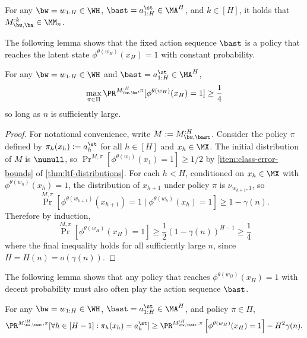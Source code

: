 \begin{fact}
For any $\bw=w_{1:H} \in \WH$, $\bast =a^\st_{1:H}\in \MA^H$, and $k \in [H]$, it holds that $M_{\bw,\ba}^{:k} \in \MM_n$.
\end{fact}

The following lemma shows that the fixed action sequence $\bast$ is a policy that reaches the latent state $\phi^{\theta(w_H)}(x_H) = 1$ with constant probability.

\begin{lemma}\label{lemma:best-policy}
For any $\bw=w_{1:H} \in \WH$ and $\bast =a^\st_{1:H}\in \MA^H$, 
\[\max_{\pi\in\Pi} \Pr^{M_{\bw,\ba}^{:H},\pi}[\phi^{\theta(w_H)}(x_H) = 1] \geq \frac{1}{4}\]
so long as $n$ is sufficiently large.
\end{lemma}

\begin{proof}
For notational convenience, write $M := M_{\bw,\bast}^{:H}$. Consider the policy $\pi$ defined by $\pi_h(x_h) := a^\st_h$ for all $h \in [H]$ and $x_h \in \MX$. The initial distribution of $M$ is $\nunull$, so $\Pr^{M,\pi}[\phi^{\theta(w_1)}(x_1) = 1] \geq 1/2$ by \cref{item:class-error-bounds} of \cref{thm:ltf-distributions}. For each $h < H$, conditioned on $x_h\in\MX$ with $\phi^{\theta(w_h)}(x_h) = 1$, the distribution of $x_{h+1}$ under policy $\pi$ is $\nu_{w_{h+1},1}$, so
\[\Pr^{M,\pi}[\phi^{\theta(w_{h+1})}(x_{h+1}) = 1 \mid{} \phi^{\theta(w_h)}(x_h) = 1] \geq 1 - \gamma(n).\]
Therefore by induction, 
\[\Pr^{M,\pi}[\phi^{\theta(w_H)}(x_H) = 1] \geq \frac{1}{2}(1-\gamma(n))^{H-1} \geq \frac{1}{4}\]
where the final inequality holds for all sufficiently large $n$, since $H = H(n) = o(\gamma(n))$.
\end{proof}

The following lemma shows that any policy that reaches $\phi^{\theta(w_H)}(x_H) = 1$ with decent probability must also often play the action sequence $\bast$.

\begin{lemma}\label{lemma:expert-agreement}
For any $\bw=w_{1:H} \in \WH$,  $\bast =a^\st_{1:H}\in \MA^H$, and policy $\pi\in\Pi$,
\[\Pr^{M^{:H}_{\bw,\bast},\pi}[\forall h \in [H-1]: \pi_h(x_h) = a^\st_h] \geq \Pr^{M_{\bw,\bast}^{:H},\pi}\left[\phi^{\theta(w_H)}(x_H) = 1\right] - H^2 \gamma(n).\]
\end{lemma}

